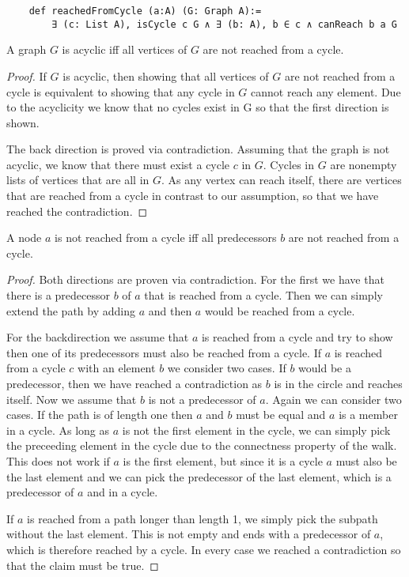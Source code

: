 \begin{lstlisting}
    def reachedFromCycle (a:A) (G: Graph A):=
        ∃ (c: List A), isCycle c G ∧ ∃ (b: A), b ∈ c ∧ canReach b a G
\end{lstlisting}

\begin{lemma}
    A graph $G$ is acyclic iff all vertices of $G$ are not reached from a cycle.
\end{lemma}
\begin{proof}
    If $G$ is acyclic, then showing that all vertices of $G$ are not reached from a cycle is equivalent to showing that any cycle in $G$ cannot reach any element. Due to the acyclicity we know that no cycles exist in G so that the first direction is shown.

    The back direction is proved via contradiction. Assuming that the graph is not acyclic, we know that there must exist a cycle $c$ in $G$. Cycles in $G$ are nonempty lists of vertices that are all in $G$. As any vertex can reach itself, there are vertices that are reached from a cycle in contrast to our assumption, so that we have reached the contradiction.
\end{proof}

\begin{lemma}
    A node $a$ is not reached from a cycle iff all predecessors $b$ are not reached from a cycle.
\end{lemma}
\begin{proof}
    Both directions are proven via contradiction. For the first we have that there is a predecessor $b$ of $a$ that is reached from a cycle. Then we can simply extend the path by adding $a$ and then $a$ would be reached from a cycle.

    For the backdirection we assume that $a$ is reached from a cycle and try to show then one of its predecessors must also be reached from a cycle. 
    If $a$ is reached from a cycle $c$ with an element $b$ we consider two cases. 
    If $b$ would be a predecessor, then we have reached a contradiction as $b$ is in the circle and reaches itself. Now we assume that $b$ is not a predecessor of $a$. Again we can consider two cases. If the path is of length one then $a$ and $b$ must be equal and $a$ is a member in a cycle. As long as $a$ is not the first element in the cycle, we can simply pick the preceeding element in the cycle due to the connectness property of the walk. This does not work if $a$ is the first element, but since it is a cycle $a$ must also be the last element and we can pick the predecessor of the last element, which is a predecessor of $a$ and in a cycle.

    If $a$ is reached from a path longer than length 1, we simply pick the subpath without the last element. This is not empty and ends with a predecessor of $a$, which is therefore reached by a cycle. In every case we reached a contradiction so that the claim must be true.
\end{proof}

